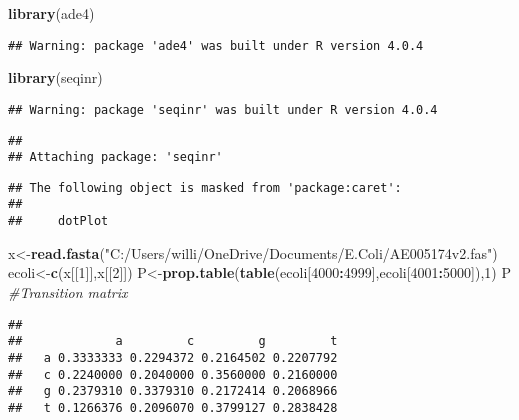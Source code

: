\documentclass[
]{article}
\newenvironment{Shaded}{\begin{snugshade}}{\end{snugshade}}
\newcommand{\CommentTok}[1]{\textcolor[rgb]{0.56,0.35,0.01}{\textit{#1}}}
\newcommand{\DecValTok}[1]{\textcolor[rgb]{0.00,0.00,0.81}{#1}}
\newcommand{\KeywordTok}[1]{\textcolor[rgb]{0.13,0.29,0.53}{\textbf{#1}}}
\newcommand{\NormalTok}[1]{#1}
\newcommand{\OperatorTok}[1]{\textcolor[rgb]{0.81,0.36,0.00}{\textbf{#1}}}
\newcommand{\StringTok}[1]{\textcolor[rgb]{0.31,0.60,0.02}{#1}}
\begin{document}
\begin{Shaded}
\begin{Highlighting}[]
\KeywordTok{library}\NormalTok{(ade4)}
\end{Highlighting}
\end{Shaded}

\begin{verbatim}
## Warning: package 'ade4' was built under R version 4.0.4
\end{verbatim}

\begin{Shaded}
\begin{Highlighting}[]
\KeywordTok{library}\NormalTok{(seqinr)}
\end{Highlighting}
\end{Shaded}

\begin{verbatim}
## Warning: package 'seqinr' was built under R version 4.0.4
\end{verbatim}

\begin{verbatim}
## 
## Attaching package: 'seqinr'
\end{verbatim}

\begin{verbatim}
## The following object is masked from 'package:caret':
## 
##     dotPlot
\end{verbatim}

\begin{Shaded}
\begin{Highlighting}[]
\NormalTok{x<-}\KeywordTok{read.fasta}\NormalTok{(}\StringTok{"C:/Users/willi/OneDrive/Documents/E.Coli/AE005174v2.fas"}\NormalTok{)}
\NormalTok{ecoli<-}\KeywordTok{c}\NormalTok{(x[[}\DecValTok{1}\NormalTok{]],x[[}\DecValTok{2}\NormalTok{]])}
\NormalTok{P<-}\KeywordTok{prop.table}\NormalTok{(}\KeywordTok{table}\NormalTok{(ecoli[}\DecValTok{4000}\OperatorTok{:}\DecValTok{4999}\NormalTok{],ecoli[}\DecValTok{4001}\OperatorTok{:}\DecValTok{5000}\NormalTok{]),}\DecValTok{1}\NormalTok{)}
\NormalTok{P }\CommentTok{#Transition matrix}
\end{Highlighting}
\end{Shaded}

\begin{verbatim}
##    
##             a         c         g         t
##   a 0.3333333 0.2294372 0.2164502 0.2207792
##   c 0.2240000 0.2040000 0.3560000 0.2160000
##   g 0.2379310 0.3379310 0.2172414 0.2068966
##   t 0.1266376 0.2096070 0.3799127 0.2838428
\end{verbatim}
\end{document}
